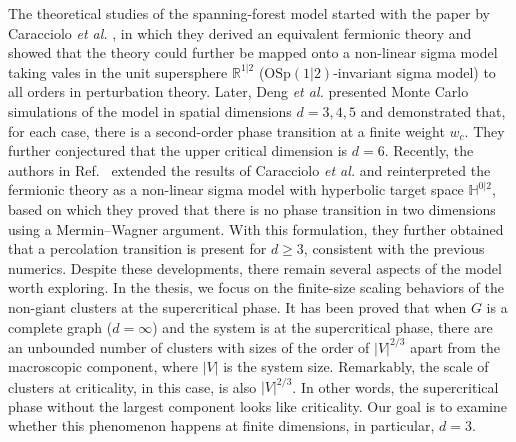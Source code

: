 The theoretical studies of the spanning-forest model started with the paper by Caracciolo \textit{et al.} \cite{Caracciolo2004}, in which they derived
an equivalent fermionic theory and showed that the theory could further be mapped onto a non-linear sigma model taking vales in the unit supersphere
$\mathbb{R}^{1|2}$ ($\text{OSp}(1|2)$-invariant sigma model) to all orders in perturbation theory. 
Later, Deng \textit{et al.}\cite{Deng2007} presented Monte Carlo simulations of the model in spatial dimensions $d = 3, 4, 5$ and demonstrated that, for each case, there is a second-order phase transition at a finite weight
$w_c$. They further conjectured that the upper critical dimension is $d=6$. Recently, the authors in Ref.~ extended the results
of Caracciolo \textit{et al.} and reinterpreted the fermionic theory as a non-linear sigma model with hyperbolic target space $\mathbb{H}^{0|2}$, based on which
they proved that there is no phase transition in two dimensions using a Mermin–Wagner argument. With this formulation, they further
obtained \cite{Roland2021Percolation} that a percolation transition is present for $d \geq 3$, consistent with the previous numerics. Despite these developments, there remain several aspects of
the model worth exploring. In the thesis, we focus on the finite-size scaling behaviors of the non-giant clusters at the supercritical phase.
It has been proved that \cite{Luczak1992,Martin2018} when $G$ is a complete graph ($d=\infty$) and the system is at the supercritical phase, there are an unbounded number of clusters with sizes of the order of $|V|^{2/3}$ apart from the macroscopic component,
where $|V|$ is the system size. Remarkably, the scale of clusters at criticality, in this case, is also $|V|^{2/3}$. In other words, the supercritical
phase without the largest component looks like criticality. Our goal is to examine whether this phenomenon happens at finite dimensions, in particular, $d=3$.



